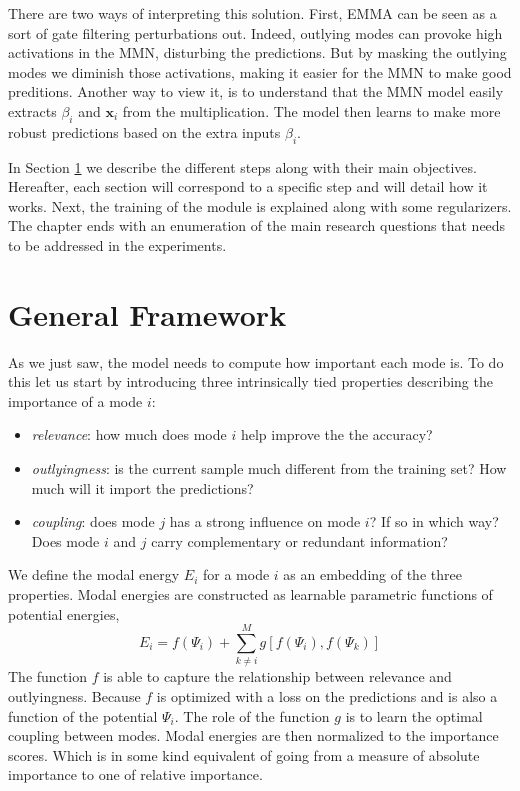 There are two ways of interpreting this solution. First, EMMA can be seen as a sort of gate filtering perturbations out. Indeed, outlying modes can provoke high activations in the MMN, disturbing the predictions. But by masking the outlying modes we diminish those activations, making it easier for the MMN to make good preditions. Another way to view it, is to understand that the MMN model easily extracts $\beta_i$ and $\mathbf{x}_i$ from the multiplication. The model then learns to make more robust predictions based on the extra inputs $\beta_i$.

In Section \ref{sec:general-framework}  we describe the different steps along with their main objectives. Hereafter, each section will correspond to a specific step and will detail how it works. Next, the training of the module is explained along with some regularizers. The chapter ends with an enumeration of the main research questions that needs to be addressed in the experiments. 


\section{General Framework}\label{sec:general-framework}

As we just saw, the model needs to compute how important each mode is. To do this let us start by introducing three intrinsically tied properties describing the importance of a mode $i$:
\begin{itemize}
\item \textit{relevance}: how much does mode $i$ help improve the the accuracy?
\item \textit{outlyingness}: is the current sample much different from the training set? How much will it import the predictions?
\item \textit{coupling}: does mode $j$ has a strong influence on mode $i$? If so in which way? Does mode $i$ and $j$ carry complementary or redundant information?
\end{itemize}
We define the modal energy $E_i$ for a mode $i$ as an embedding of the three properties. Modal energies are constructed as learnable parametric functions of potential energies,
\begin{equation}
E_i = f(\Psi_i)  + \sum_{k\neq i}^M g[f(\Psi_i), f(\Psi_k)]
\label{eq:general-framework}
\end{equation}
The function $f$ is able to capture the relationship between relevance and outlyingness. Because $f$ is optimized with a loss on the predictions and is also a function of the potential $\Psi_i$. The role of the function $g$ is to learn the optimal coupling between modes. Modal energies are then normalized to the importance scores. Which is in some kind equivalent of going from a measure of absolute importance to one of relative importance.

